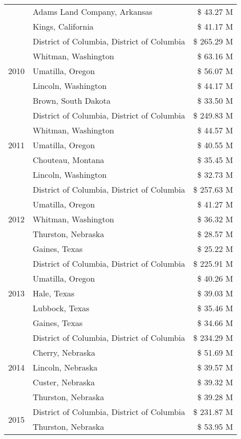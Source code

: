 \begin{tabular}{llr}
 & Adams Land Company, Arkansas & \$ 43.27 M \\
 & Kings, California & \$ 41.17 M \\
\cline{1-3}
\multirow[t]{5}{*}{2010} & District of Columbia, District of Columbia & \$ 265.29 M \\
 & Whitman, Washington & \$ 63.16 M \\
 & Umatilla, Oregon & \$ 56.07 M \\
 & Lincoln, Washington & \$ 44.17 M \\
 & Brown, South Dakota & \$ 33.50 M \\
\cline{1-3}
\multirow[t]{5}{*}{2011} & District of Columbia, District of Columbia & \$ 249.83 M \\
 & Whitman, Washington & \$ 44.57 M \\
 & Umatilla, Oregon & \$ 40.55 M \\
 & Chouteau, Montana & \$ 35.45 M \\
 & Lincoln, Washington & \$ 32.73 M \\
\cline{1-3}
\multirow[t]{5}{*}{2012} & District of Columbia, District of Columbia & \$ 257.63 M \\
 & Umatilla, Oregon & \$ 41.27 M \\
 & Whitman, Washington & \$ 36.32 M \\
 & Thurston, Nebraska & \$ 28.57 M \\
 & Gaines, Texas & \$ 25.22 M \\
\cline{1-3}
\multirow[t]{5}{*}{2013} & District of Columbia, District of Columbia & \$ 225.91 M \\
 & Umatilla, Oregon & \$ 40.26 M \\
 & Hale, Texas & \$ 39.03 M \\
 & Lubbock, Texas & \$ 35.46 M \\
 & Gaines, Texas & \$ 34.66 M \\
\cline{1-3}
\multirow[t]{5}{*}{2014} & District of Columbia, District of Columbia & \$ 234.29 M \\
 & Cherry, Nebraska & \$ 51.69 M \\
 & Lincoln, Nebraska & \$ 39.57 M \\
 & Custer, Nebraska & \$ 39.32 M \\
 & Thurston, Nebraska & \$ 39.28 M \\
\cline{1-3}
\multirow[t]{5}{*}{2015} & District of Columbia, District of Columbia & \$ 231.87 M \\
 & Thurston, Nebraska & \$ 53.95 M \\

\end{tabular}
